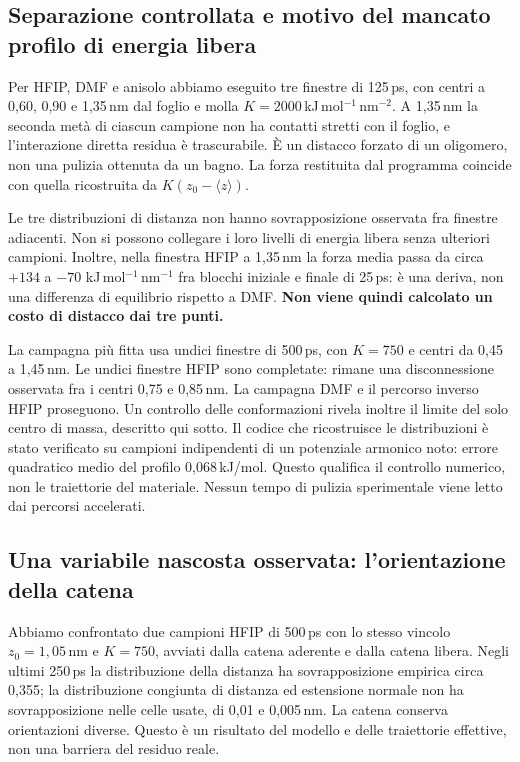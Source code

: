 \documentclass[11pt,reqno]{amsart}
\numberwithin{equation}{section}
\begin{document}
\subsection{Separazione controllata e motivo del mancato profilo di energia libera}

Per HFIP, DMF e anisolo abbiamo eseguito tre finestre di 125\,ps,
con centri a 0,60, 0,90 e 1,35\,nm dal foglio e molla
$K=2000$\,kJ\,mol$^{-1}$\,nm$^{-2}$. A 1,35\,nm la seconda
met\`a di ciascun campione non ha contatti stretti con il foglio,
e l'interazione diretta residua \`e trascurabile. \`E un distacco
forzato di un oligomero, non una pulizia ottenuta da un bagno.
La forza restituita dal programma coincide con quella ricostruita
da $K(z_0-\langle z\rangle)$.

Le tre distribuzioni di distanza non hanno sovrapposizione osservata
fra finestre adiacenti. Non si possono collegare i loro livelli
di energia libera senza ulteriori campioni. Inoltre, nella finestra
HFIP a 1,35\,nm la forza media passa da circa $+134$ a $-70$
kJ\,mol$^{-1}$\,nm$^{-1}$ fra blocchi iniziale e finale di 25\,ps:
\`e una deriva, non una differenza di equilibrio rispetto a DMF.
\textbf{Non viene quindi calcolato un costo di distacco dai tre punti.}

La campagna pi\`u fitta usa undici finestre di 500\,ps,
con $K=750$ e centri da 0,45 a 1,45\,nm. Le undici finestre
HFIP sono completate: rimane una disconnessione osservata fra
i centri 0,75 e 0,85\,nm. La campagna DMF e il percorso inverso
HFIP proseguono. Un controllo delle conformazioni rivela inoltre
il limite del solo centro di massa, descritto qui sotto.
Il codice che ricostruisce le distribuzioni \`e stato verificato
su campioni indipendenti di un potenziale armonico noto:
errore quadratico medio del profilo 0,068\,kJ/mol.
Questo qualifica il controllo numerico, non le traiettorie del materiale.
Nessun tempo di pulizia sperimentale viene letto dai percorsi accelerati.

\subsection{Una variabile nascosta osservata: l'orientazione della catena}

Abbiamo confrontato due campioni HFIP di 500\,ps con lo stesso
vincolo $z_0=1{,}05$\,nm e $K=750$, avviati dalla catena aderente
e dalla catena libera. Negli ultimi 250\,ps la distribuzione della
distanza ha sovrapposizione empirica circa 0,355; la distribuzione
congiunta di distanza ed estensione normale non ha sovrapposizione
nelle celle usate, di 0,01 e 0,005\,nm. La catena conserva
orientazioni diverse. Questo \`e un risultato del modello e
delle traiettorie effettive, non una barriera del residuo reale.
\end{document}
